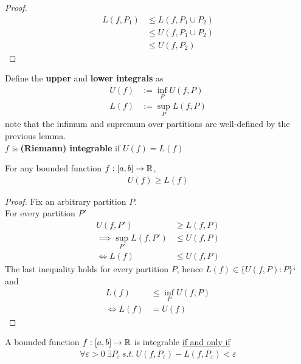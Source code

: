 \documentclass[11pt]{article}
\begin{document}
	\begin{proof}
		\begin{align}
			L(f, P_1) &\leq L(f, P_1 \cup P_2) \\
			&\leq U(f, P_1 \cup P_2) \\
			&\leq U(f, P_2)
		\end{align}
	\end{proof}
	
	\begin{definition}
		Define the \textbf{upper} and \textbf{lower integrals} as 
		\begin{align}
			U(f) &:= \inf_P U(f, P) \\
			L(f) &:= \sup_P L(f, P)
		\end{align}
		note that the infimum and supremum over partitions are well-defined by the previous lemma. \\
		$f$ is \textbf{(Riemann) integrable} if $U(f) = L(f)$
	\end{definition}
	
	\begin{lemma}
		For any bounded function $f: [a, b] \to \mathbb{R}$,
		\begin{align}
			U(f) \geq L(f)
		\end{align}
	\end{lemma}
	
	\begin{proof}
		Fix an arbitrary partition $P$. \\
		For every partition $P'$
		\begin{align}
			U(f, P') &\geq L(f, P) \\
			\implies \sup_{P'} L(f, P') &\leq U(f, P) \\
			\iff L(f) &\leq U(f, P)
		\end{align}
		The last inequality holds for every partition $P$, hence $L(f) \in \{U(f, P): P\}^\downarrow$ and
		\begin{align}
			L(f) &\leq \inf_{P} U(f, P) \\
			\iff L(f) &= U(f)
		\end{align}
	\end{proof}
	
	\begin{theorem}
		A bounded function $f: [a, b] \to \mathbb{R}$ is integrable \ul{if and only if}
		\begin{align}
			\forall \varepsilon > 0\ \exists P_\varepsilon\ s.t.\ U(f, P_\varepsilon) - L(f, P_\varepsilon) < \varepsilon
		\end{align}
	\end{theorem}
	
\end{document}
